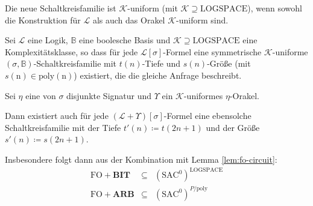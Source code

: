 Die neue Schaltkreisfamilie ist $\mathcal{K}$-uniform (mit $\mathcal{K}\supseteq\mathrm{LOGSPACE}$),
wenn sowohl die Konstruktion für $\mathcal{L}$ als auch das Orakel
$\mathcal{K}$-uniform sind.
\begin{lem}
\label{lem:oracle-circuit}Sei $\mathcal{L}$ eine Logik, $\mathbb{B}$
eine boolesche Basis und $\mathcal{K}\supseteq\mathrm{LOGSPACE}$
eine Komplexitätsklasse, so dass für jede $\mathcal{L}\left[\sigma\right]$-Formel
eine symmetrische $\mathcal{K}$-uniforme $\left(\sigma,\mathbb{B}\right)$-Schaltkreisfamilie
mit $t\left(n\right)$-Tiefe und $s\left(n\right)$-Größe (mit $s\mathrm{\left(n\right)\in\mathrm{poly}\left(n\right)}$)
existiert, die die gleiche Anfrage beschreibt.

Sei $\eta$ eine von $\sigma$ disjunkte Signatur und $\Upsilon$
ein $\mathcal{K}$-uniformes $\eta$-Orakel.

Dann existiert auch für jede $\left(\mathcal{L}+\Upsilon\right)\left[\sigma\right]$-Formel
eine ebensolche Schaltkreisfamilie mit der Tiefe $t'\left(n\right)\coloneqq t\left(2n+1\right)$
und der Größe $s'\left(n\right)\coloneqq s\left(2n+1\right)$.
\end{lem}
Insbesondere folgt dann aus der Kombination mit Lemma \ref{lem:fo-circuit}:
\begin{eqnarray*}
\mathrm{FO}+\mathbf{BIT} & \subseteq & \left(\mathrm{SAC}^{0}\right)^{\mathrm{LOGSPACE}}\\
\mathrm{FO}+\mathbf{ARB} & \subseteq & \left(\mathrm{SAC}^{0}\right)^{P/\mathrm{poly}}
\end{eqnarray*}

